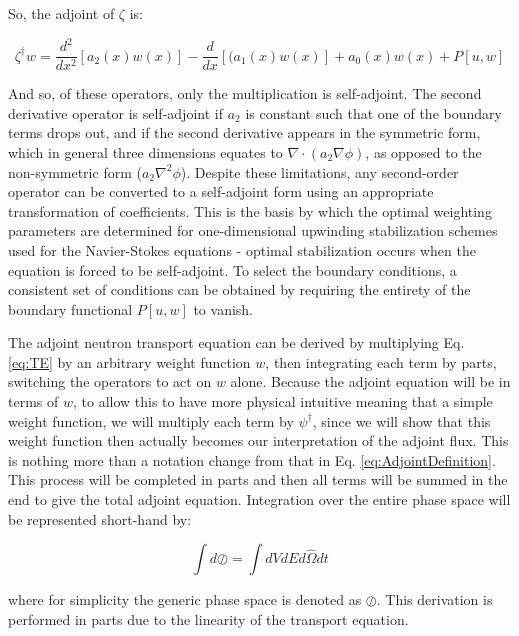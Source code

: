 \documentclass[10pt]{article}
\begin{document}
\begin{flushleft}
\begin{tcolorbox}[breakable]
So, the adjoint of \(\zeta\) is:

\begin{equation}
\zeta^\dagger w= \frac{d^2}{dx^2}\left\lbrack a_2(x)w(x)\right\rbrack -\frac{d}{dx}\left\lbrack(a_1(x)w(x)\right\rbrack+a_0(x)w(x)+P[u,w]
\end{equation}

And so, of these operators, only the multiplication is self-adjoint. The second derivative operator is self-adjoint if \(a_2\) is constant such that one of the boundary terms drops out, and if the second derivative appears in the symmetric form, which in general three dimensions equates to \(\nabla\cdot(a_2\nabla \phi)\), as opposed to the non-symmetric form (\(a_2\nabla^2 \phi\)). Despite these limitations, any second-order operator can be converted to a self-adjoint form using an appropriate transformation of coefficients. This is the basis by which the optimal weighting parameters are determined for one-dimensional upwinding stabilization schemes used for the Navier-Stokes equations - optimal stabilization occurs when the equation is forced to be self-adjoint. To select the boundary conditions, a consistent set of conditions can be obtained by requiring the entirety of the boundary functional \(P[u,w]\) to vanish. 
\end{tcolorbox}

The adjoint neutron transport equation can be derived by multiplying Eq. \ref{eq:TE} by an arbitrary weight function \(w\), then integrating each term by parts, switching the operators to act on \(w\) alone. Because the adjoint equation will be in terms of \(w\), to allow this to have more physical intuitive meaning that a simple weight function, we will multiply each term by \(\psi^\dagger\), since we will show that this weight function then actually becomes our interpretation of the adjoint flux. This is nothing more than a notation change from that in Eq. \ref{eq:AdjointDefinition}. This process will be completed in parts and then all terms will be summed in the end to give the total adjoint equation. Integration over the entire phase space will be represented short-hand by:

\begin{equation}
\label{eq:PhaseSpaceIntegration}
\int d\oslash = \int dVdEd\hat{\Omega}dt
\end{equation}

where for simplicity the generic phase space is denoted as \(\oslash\). This derivation is performed in parts due to the linearity of the transport equation.


\end{flushleft}
\end{document}
